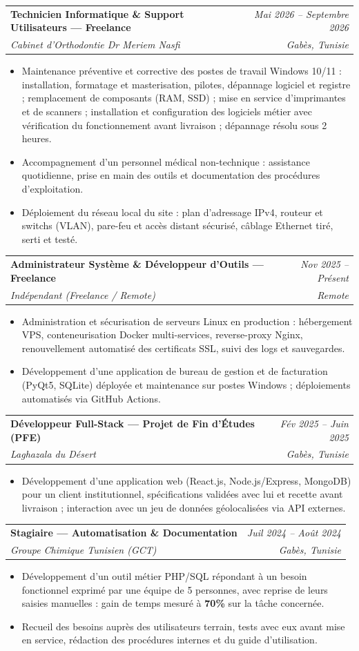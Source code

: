 \documentclass[letterpaper,9pt]{article}
\makeatletter
\newcommand{\resumeItem}[1]{\item\small{#1}}
\newcommand{\resumeSubheading}[4]{
  \vspace{-1pt}\item
  \begin{tabular*}{0.97\textwidth}[t]{l@{\extracolsep{\fill}}r}
    \textbf{#1} & \textit{\color{greytext}#2} \\
    \textit{\small\color{greytext} #3} & \textit{\small\color{greytext} #4}
  \end{tabular*}\vspace{-2pt}
}
\newcommand{\resumeItemListStart}{\begin{itemize}[leftmargin=0.24in, label={}, itemsep=0.9pt, topsep=1.2pt, parsep=0pt]}
\newcommand{\resumeItemListEnd}{\end{itemize}\vspace{-2pt}}
\makeatother
\begin{document}
  \resumeSubheading{Technicien Informatique \& Support Utilisateurs --- Freelance}{Mai 2026 -- Septembre 2026}{Cabinet d'Orthodontie Dr Meriem Nasfi}{Gabès, Tunisie}
    \resumeItemListStart
      \resumeItem{Maintenance préventive et corrective des postes de travail Windows 10/11 : installation, formatage et masterisation, pilotes, dépannage logiciel et registre ; remplacement de composants (RAM, SSD) ; mise en service d'imprimantes et de scanners ; installation et configuration des logiciels métier avec vérification du fonctionnement avant livraison ; dépannage résolu sous 2 heures.}
      \resumeItem{Accompagnement d'un personnel médical non-technique : assistance quotidienne, prise en main des outils et documentation des procédures d'exploitation.}
      \resumeItem{Déploiement du réseau local du site : plan d'adressage IPv4, routeur et switchs (VLAN), pare-feu et accès distant sécurisé, câblage Ethernet tiré, serti et testé.}
    \resumeItemListEnd

  \resumeSubheading{Administrateur Système \& Développeur d'Outils --- Freelance}{Nov 2025 -- Présent}{Indépendant (Freelance / Remote)}{Remote}
    \resumeItemListStart
      \resumeItem{Administration et sécurisation de serveurs Linux en production : hébergement VPS, conteneurisation Docker multi-services, reverse-proxy Nginx, renouvellement automatisé des certificats SSL, suivi des logs et sauvegardes.}
      \resumeItem{Développement d'une application de bureau de gestion et de facturation (PyQt5, SQLite) déployée et maintenance sur postes Windows ; déploiements automatisés via GitHub Actions.}
    \resumeItemListEnd

  \resumeSubheading{Développeur Full-Stack --- Projet de Fin d'Études (PFE)}{Fév 2025 -- Juin 2025}{Laghazala du Désert}{Gabès, Tunisie}
    \resumeItemListStart
      \resumeItem{Développement d'une application web (React.js, Node.js/Express, MongoDB) pour un client institutionnel, spécifications validées avec lui et recette avant livraison ; interaction avec un jeu de données géolocalisées via API externes.}
    \resumeItemListEnd

  \resumeSubheading{Stagiaire --- Automatisation \& Documentation}{Juil 2024 -- Août 2024}{Groupe Chimique Tunisien (GCT)}{Gabès, Tunisie}
    \resumeItemListStart
      \resumeItem{Développement d'un outil métier PHP/SQL répondant à un besoin fonctionnel exprimé par une équipe de 5 personnes, avec reprise de leurs saisies manuelles : gain de temps mesuré à \textbf{70\%} sur la tâche concernée.}
      \resumeItem{Recueil des besoins auprès des utilisateurs terrain, tests avec eux avant mise en service, rédaction des procédures internes et du guide d'utilisation.}
    \resumeItemListEnd
\end{document}
